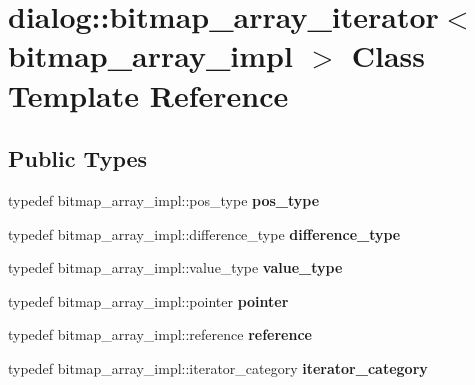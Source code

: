 \hypertarget{classdialog_1_1bitmap__array__iterator}{}\section{dialog\+:\+:bitmap\+\_\+array\+\_\+iterator$<$ bitmap\+\_\+array\+\_\+impl $>$ Class Template Reference}
\label{classdialog_1_1bitmap__array__iterator}
\subsection*{Public Types}
\begin{DoxyCompactItemize}
\item 
\mbox{\label{classdialog_1_1bitmap__array__iterator_a87868981d5806d6964013d5bf25852fe}} 
typedef bitmap\+\_\+array\+\_\+impl\+::pos\+\_\+type {\bfseries pos\+\_\+type}
\item 
\mbox{\label{classdialog_1_1bitmap__array__iterator_a970d92e3251b4a7efb85e5c6c2517bf3}} 
typedef bitmap\+\_\+array\+\_\+impl\+::difference\+\_\+type {\bfseries difference\+\_\+type}
\item 
\mbox{\label{classdialog_1_1bitmap__array__iterator_a690a87e957228bc2fcc46ff2fce1fa74}} 
typedef bitmap\+\_\+array\+\_\+impl\+::value\+\_\+type {\bfseries value\+\_\+type}
\item 
\mbox{\label{classdialog_1_1bitmap__array__iterator_a1acce57abff5d1de76b89aaeb3178582}} 
typedef bitmap\+\_\+array\+\_\+impl\+::pointer {\bfseries pointer}
\item 
\mbox{\label{classdialog_1_1bitmap__array__iterator_a44c587eec718b7238bb440582f2e6043}} 
typedef bitmap\+\_\+array\+\_\+impl\+::reference {\bfseries reference}
\item 
\mbox{\label{classdialog_1_1bitmap__array__iterator_a635aa79f15af7f05f611ff869882e464}} 
typedef bitmap\+\_\+array\+\_\+impl\+::iterator\+\_\+category {\bfseries iterator\+\_\+category}
\end{DoxyCompactItemize}
